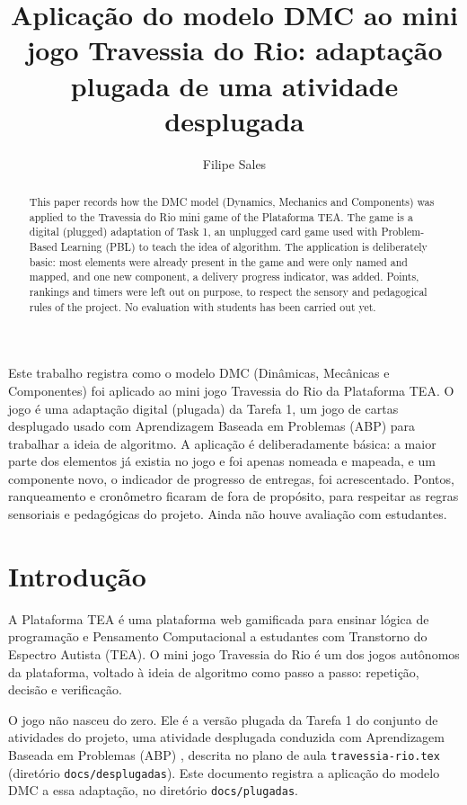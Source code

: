 \documentclass[12pt]{article}
\title{Aplicação do modelo DMC ao mini jogo Travessia do Rio: adaptação plugada de uma atividade desplugada}
\author{Filipe Sales\inst{1}}
\begin{document}
\maketitle

\begin{abstract}
  This paper records how the DMC model (Dynamics, Mechanics and Components) was
  applied to the Travessia do Rio mini game of the Plataforma TEA. The game is a
  digital (plugged) adaptation of Task 1, an unplugged card game used with
  Problem-Based Learning (PBL) to teach the idea of algorithm. The application is
  deliberately basic: most elements were already present in the game and were
  only named and mapped, and one new component, a delivery progress indicator,
  was added. Points, rankings and timers were left out on purpose, to respect the
  sensory and pedagogical rules of the project. No evaluation with students has
  been carried out yet.
\end{abstract}

\begin{resumo}
  Este trabalho registra como o modelo DMC (Dinâmicas, Mecânicas e Componentes)
  foi aplicado ao mini jogo Travessia do Rio da Plataforma TEA. O jogo é uma
  adaptação digital (plugada) da Tarefa 1, um jogo de cartas desplugado usado com
  Aprendizagem Baseada em Problemas (ABP) para trabalhar a ideia de algoritmo. A
  aplicação é deliberadamente básica: a maior parte dos elementos já existia no
  jogo e foi apenas nomeada e mapeada, e um componente novo, o indicador de
  progresso de entregas, foi acrescentado. Pontos, ranqueamento e cronômetro
  ficaram de fora de propósito, para respeitar as regras sensoriais e
  pedagógicas do projeto. Ainda não houve avaliação com estudantes.
\end{resumo}

\section{Introdução}

A Plataforma TEA é uma plataforma web gamificada para ensinar lógica de
programação e Pensamento Computacional a estudantes com Transtorno do Espectro
Autista (TEA). O mini jogo Travessia do Rio é um dos jogos autônomos da
plataforma, voltado à ideia de algoritmo como passo a passo: repetição, decisão
e verificação.

O jogo não nasceu do zero. Ele é a versão plugada da Tarefa 1 do conjunto de
atividades do projeto, uma atividade desplugada \cite{bell2009} conduzida com
Aprendizagem Baseada em Problemas (ABP) \cite{barrows1986,hmelo2004}, descrita no
plano de aula \texttt{travessia-rio.tex} (diretório \texttt{docs/desplugadas}).
Este documento registra a aplicação do modelo DMC \cite{werbach2012} a essa
adaptação, no diretório \texttt{docs/plugadas}.
\end{document}

